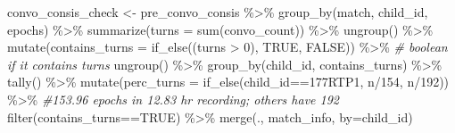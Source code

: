 \documentclass[
]{article}
\newenvironment{Shaded}{\begin{snugshade}}{\end{snugshade}}
\newcommand{\AttributeTok}[1]{\textcolor[rgb]{0.77,0.63,0.00}{#1}}
\newcommand{\CommentTok}[1]{\textcolor[rgb]{0.56,0.35,0.01}{\textit{#1}}}
\newcommand{\DecValTok}[1]{\textcolor[rgb]{0.00,0.00,0.81}{#1}}
\newcommand{\FunctionTok}[1]{\textcolor[rgb]{0.00,0.00,0.00}{#1}}
\newcommand{\NormalTok}[1]{#1}
\newcommand{\OtherTok}[1]{\textcolor[rgb]{0.56,0.35,0.01}{#1}}
\newcommand{\SpecialCharTok}[1]{\textcolor[rgb]{0.00,0.00,0.00}{#1}}
\newcommand{\StringTok}[1]{\textcolor[rgb]{0.31,0.60,0.02}{#1}}
\begin{document}
\begin{Shaded}
\begin{Highlighting}[]
\NormalTok{convo\_consis\_check }\OtherTok{\textless{}{-}}\NormalTok{ pre\_convo\_consis }\SpecialCharTok{\%\textgreater{}\%}
  \FunctionTok{group\_by}\NormalTok{(match, child\_id, epochs) }\SpecialCharTok{\%\textgreater{}\%}
  \FunctionTok{summarize}\NormalTok{(}\AttributeTok{turns =} \FunctionTok{sum}\NormalTok{(convo\_count)) }\SpecialCharTok{\%\textgreater{}\%}
  \FunctionTok{ungroup}\NormalTok{() }\SpecialCharTok{\%\textgreater{}\%}
  \FunctionTok{mutate}\NormalTok{(}\AttributeTok{contains\_turns =} \FunctionTok{if\_else}\NormalTok{((turns }\SpecialCharTok{\textgreater{}} \DecValTok{0}\NormalTok{), }\StringTok{\textquotesingle{}TRUE\textquotesingle{}}\NormalTok{, }\StringTok{\textquotesingle{}FALSE\textquotesingle{}}\NormalTok{)) }\SpecialCharTok{\%\textgreater{}\%} \CommentTok{\# boolean if it contains turns}
  \FunctionTok{ungroup}\NormalTok{() }\SpecialCharTok{\%\textgreater{}\%}
  \FunctionTok{group\_by}\NormalTok{(child\_id, contains\_turns) }\SpecialCharTok{\%\textgreater{}\%}
  \FunctionTok{tally}\NormalTok{() }\SpecialCharTok{\%\textgreater{}\%}
  \FunctionTok{mutate}\NormalTok{(}\AttributeTok{perc\_turns =} \FunctionTok{if\_else}\NormalTok{(child\_id}\SpecialCharTok{==}\StringTok{\textquotesingle{}177RTP1\textquotesingle{}}\NormalTok{, n}\SpecialCharTok{/}\DecValTok{154}\NormalTok{, n}\SpecialCharTok{/}\DecValTok{192}\NormalTok{)) }\SpecialCharTok{\%\textgreater{}\%} \CommentTok{\#153.96 epochs in 12.83 hr recording; others have 192 }
  \FunctionTok{filter}\NormalTok{(contains\_turns}\SpecialCharTok{==}\StringTok{\textquotesingle{}TRUE\textquotesingle{}}\NormalTok{) }\SpecialCharTok{\%\textgreater{}\%}
  \FunctionTok{merge}\NormalTok{(., match\_info, }\AttributeTok{by=}\StringTok{\textquotesingle{}child\_id\textquotesingle{}}\NormalTok{) }


\end{Highlighting}
\end{Shaded}
\end{document}
